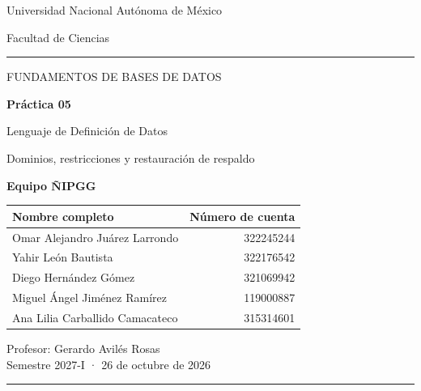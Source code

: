 \hypersetup{pageanchor=false}
\begin{titlepage}
\thispagestyle{empty}
{\sffamily\color{Tinta}\large Universidad Nacional Autónoma de México\par
\normalsize Facultad de Ciencias\par}
\vspace{9mm}
{\color{Acento}\rule{\linewidth}{1.2pt}\par}
\vspace{14mm}
{\sffamily\color{Acento}\large FUNDAMENTOS DE BASES DE DATOS\par}
\vspace{6mm}
{\sffamily\color{Tinta}\fontsize{32}{38}\selectfont\bfseries Práctica 05\par}
\vspace{4mm}
{\sffamily\color{Tinta}\fontsize{21}{27}\selectfont Lenguaje de Definición de Datos\par}
\vspace{7mm}
{\large Dominios, restricciones y restauración de respaldo\par}
\vfill
{\sffamily\color{Tinta}\large\bfseries Equipo ÑIPGG\par}
\vspace{4mm}
\begin{tabularx}{\linewidth}{@{}Xr@{}}
\toprule
\textbf{Nombre completo} & \textbf{Número de cuenta}\\\midrule
Omar Alejandro Juárez Larrondo & 322245244\\[5pt]
Yahir León Bautista & 322176542\\[5pt]
Diego Hernández Gómez & 321069942\\[5pt]
Miguel Ángel Jiménez Ramírez & 119000887\\[5pt]
Ana Lilia Carballido Camacateco & 315314601\\\bottomrule
\end{tabularx}\par
\vspace{9mm}
Profesor: Gerardo Avilés Rosas\\
Semestre 2027-I · 26 de octubre de 2026\par
\vspace{7mm}
{\color{Linea}\rule{\linewidth}{.6pt}\par}
\end{titlepage}
\hypersetup{pageanchor=true}
